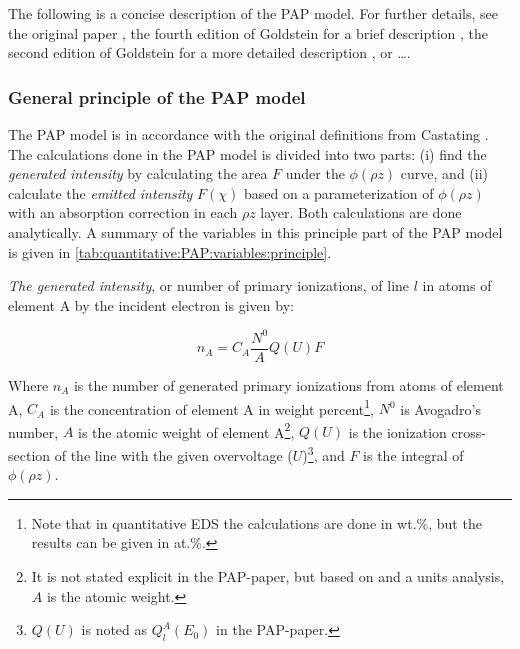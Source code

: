 The following is a concise description of the PAP model. 
For further details, see the original paper \cite{pap_1991}, the fourth edition of Goldstein for a brief description \cite{goldstein_scanning_2018}, the second edition of Goldstein for a more detailed description \cite{goldstein_2ed_1992}, or \dots {}.








\subsubsection{General principle of the PAP model}
\label{theory:quantitative:pap:general_principle}

The PAP model is in accordance with the original definitions from Castating \cite{castaing_1951}.
The calculations done in the PAP model is divided into two parts: (i) find the \emph{generated intensity} by calculating the area $F$ under the $\phi(\rho z)$ curve, and (ii) calculate the \emph{emitted intensity} $F(\chi)$ based on a parameterization of $\phi(\rho z)$ with an absorption correction in each $\rho z$ layer.
Both calculations are done analytically.
A summary of the variables in this principle part of the PAP model is given in \cref{tab:quantitative:PAP:variables:principle}.


\emph{The generated intensity}, or number of primary ionizations, of line $l$ in atoms of element A by the incident electron is given by:

\begin{equation}
    \label{eq:theory:quantitative:pap:general_principle:n_a}
    n_A = C_A \frac{N^0}{A} Q(U) F
\end{equation}

Where $n_A$ is the number of generated primary ionizations from atoms of element A, $C_A$ is the concentration of element A in weight percent\footnote{Note that in quantitative EDS the calculations are done in wt.\%, but the results can be given in at.\%.}, $N^0$ is Avogadro's number, $A$ is the atomic weight of element A\footnote{It is not stated explicit in the PAP-paper, but based on \cite{love_scott_1990} and a units analysis, $A$ is the atomic weight.}, $Q(U)$ is the ionization cross-section of the line with the given overvoltage ($U$)\footnote{$Q(U)$ is noted as $Q_l^A(E_0)$ in the PAP-paper.}, and $F$ is the integral of $\phi(\rho z)$.

